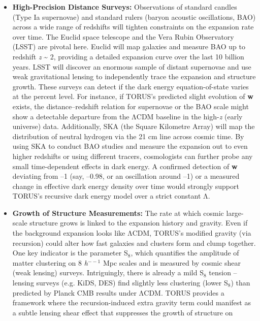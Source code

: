 \documentclass[]{article}
\newcommand{\subscript}[1]{\ensuremath{_{\mathrm{#1}}}}
\newcommand{\superscript}[1]{\ensuremath{^{\mathrm{#1}}}}
\begin{document}
\begin{itemize}
\item
  \textbf{High-Precision Distance Surveys:} Observations of standard
  candles (Type Ia supernovae) and standard rulers (baryon acoustic
  oscillations, BAO) across a wide range of redshifts will tighten
  constraints on the expansion rate over time. The Euclid space
  telescope and the Vera Rubin Observatory (LSST) are pivotal here.
  Euclid will map galaxies and measure BAO up to redshift \emph{z}
  \textasciitilde{} 2, providing a detailed expansion curve over the
  last 10 billion years. LSST will discover an enormous sample of
  distant supernovae and use weak gravitational lensing to independently
  trace the expansion and structure growth. These surveys can detect if
  the dark energy equation-of-state varies at the percent level. For
  instance, if TORUS's predicted slight evolution of \textbf{w} exists,
  the distance--redshift relation for supernovae or the BAO scale might
  show a detectable departure from the ΛCDM baseline in the
  high-\emph{z} (early universe) data. Additionally, SKA (the Square
  Kilometre Array) will map the distribution of neutral hydrogen via the
  21 cm line across cosmic time. By using SKA to conduct BAO studies and
  measure the expansion out to even higher redshifts or using different
  tracers, cosmologists can further probe any small time-dependent
  effects in dark energy. A confirmed detection of \textbf{w} deviating
  from --1 (say, --0.98, or an oscillation around --1) or a measured
  change in effective dark energy density over time would strongly
  support TORUS's recursive dark energy model over a strict constant Λ.
\item
  \textbf{Growth of Structure Measurements:} The rate at which cosmic
  large-scale structure grows is linked to the expansion history and
  gravity. Even if the background expansion looks like ΛCDM, TORUS's
  modified gravity (via recursion) could alter how fast galaxies and
  clusters form and clump together. One key indicator is the parameter
  S\subscript{8}, which
  quantifies the amplitude of matter clustering on 8
  \emph{h}\superscript{--1}
  Mpc scales and is measured by cosmic shear (weak lensing) surveys.
  Intriguingly, there is already a mild
  S\subscript{8} tension --
  lensing surveys (e.g. KiDS, DES) find slightly less clustering (lower
  S\subscript{8}) than
  predicted by Planck CMB results under ΛCDM. TORUS provides a framework
  where the recursion-induced extra gravity term could manifest as a
  subtle lensing shear effect that suppresses the growth of structure on

\end{itemize}
\end{document}
